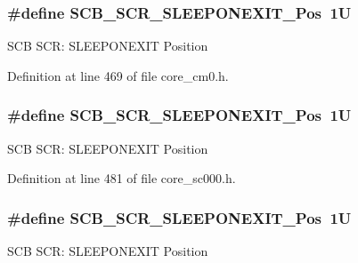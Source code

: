 \subsubsection[{\texorpdfstring{S\+C\+B\+\_\+\+S\+C\+R\+\_\+\+S\+L\+E\+E\+P\+O\+N\+E\+X\+I\+T\+\_\+\+Pos}{SCB_SCR_SLEEPONEXIT_Pos}}]{\setlength{\rightskip}{0pt plus 5cm}\#define S\+C\+B\+\_\+\+S\+C\+R\+\_\+\+S\+L\+E\+E\+P\+O\+N\+E\+X\+I\+T\+\_\+\+Pos~1U}\hypertarget{group___c_m_s_i_s___s_c_b_ga3680a15114d7fdc1e25043b881308fe9}{}\label{group___c_m_s_i_s___s_c_b_ga3680a15114d7fdc1e25043b881308fe9}
S\+CB S\+CR\+: S\+L\+E\+E\+P\+O\+N\+E\+X\+IT Position 

Definition at line 469 of file core\+\_\+cm0.\+h.

\subsubsection[{\texorpdfstring{S\+C\+B\+\_\+\+S\+C\+R\+\_\+\+S\+L\+E\+E\+P\+O\+N\+E\+X\+I\+T\+\_\+\+Pos}{SCB_SCR_SLEEPONEXIT_Pos}}]{\setlength{\rightskip}{0pt plus 5cm}\#define S\+C\+B\+\_\+\+S\+C\+R\+\_\+\+S\+L\+E\+E\+P\+O\+N\+E\+X\+I\+T\+\_\+\+Pos~1U}\hypertarget{group___c_m_s_i_s___s_c_b_ga3680a15114d7fdc1e25043b881308fe9}{}\label{group___c_m_s_i_s___s_c_b_ga3680a15114d7fdc1e25043b881308fe9}
S\+CB S\+CR\+: S\+L\+E\+E\+P\+O\+N\+E\+X\+IT Position 

Definition at line 481 of file core\+\_\+sc000.\+h.

\subsubsection[{\texorpdfstring{S\+C\+B\+\_\+\+S\+C\+R\+\_\+\+S\+L\+E\+E\+P\+O\+N\+E\+X\+I\+T\+\_\+\+Pos}{SCB_SCR_SLEEPONEXIT_Pos}}]{\setlength{\rightskip}{0pt plus 5cm}\#define S\+C\+B\+\_\+\+S\+C\+R\+\_\+\+S\+L\+E\+E\+P\+O\+N\+E\+X\+I\+T\+\_\+\+Pos~1U}\hypertarget{group___c_m_s_i_s___s_c_b_ga3680a15114d7fdc1e25043b881308fe9}{}\label{group___c_m_s_i_s___s_c_b_ga3680a15114d7fdc1e25043b881308fe9}
S\+CB S\+CR\+: S\+L\+E\+E\+P\+O\+N\+E\+X\+IT Position 

